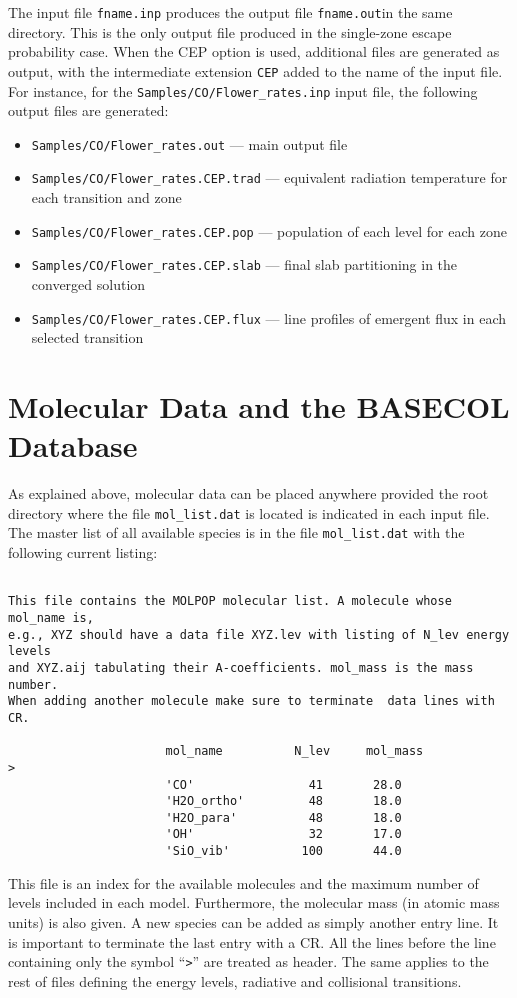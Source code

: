 \documentclass[12pt]{article}
\begin{document}
The input file \texttt{fname.inp} produces the output file \texttt{fname.out}in
the same directory. This is the only output file produced in the single-zone
escape probability case. When the CEP option is used, additional files are
generated as output, with the intermediate extension \texttt{CEP} added to the
name of the input file. For instance, for the
\texttt{Samples/CO/Flower\_rates.inp} input file, the following output files
are generated:
\begin{itemize}
\item
\texttt{Samples/CO/Flower\_rates.out} --- main output file
\item
\texttt{Samples/CO/Flower\_rates.CEP.trad} --- equivalent radiation
temperature for each transition and zone
\item
\texttt{Samples/CO/Flower\_rates.CEP.pop} --- population of each level for
each zone
\item
\texttt{Samples/CO/Flower\_rates.CEP.slab} --- final slab partitioning in
the converged solution
\item
\texttt{Samples/CO/Flower\_rates.CEP.flux} --- line profiles of emergent
flux in each selected transition
\end{itemize}

\section{Molecular Data and the BASECOL Database}
\label{sec:basecol}


As explained above, molecular data can be placed anywhere provided the root
directory where the file \texttt{mol\_list.dat} is located is indicated in each
input file. The master list of all available species is in the file
\texttt{mol\_list.dat} with the following current listing:


\begin{verbatim}

This file contains the MOLPOP molecular list. A molecule whose mol_name is,
e.g., XYZ should have a data file XYZ.lev with listing of N_lev energy levels
and XYZ.aij tabulating their A-coefficients. mol_mass is the mass number.
When adding another molecule make sure to terminate  data lines with CR.

                      mol_name          N_lev     mol_mass
>
                      'CO'                41       28.0
                      'H2O_ortho'         48       18.0
                      'H2O_para'          48       18.0
                      'OH'                32       17.0
                      'SiO_vib'          100       44.0

\end{verbatim}
This file is an index for the available molecules and the maximum number of levels included in each
model. Furthermore, the molecular mass (in atomic mass units) is also given. A new species can be added as
simply another entry line. It is important to terminate the last entry with a CR.
All the lines before the line containing only the symbol ``\texttt{>}'' are
treated as header. The same applies to the rest of files defining the energy
levels, radiative and collisional transitions.
\end{document}
